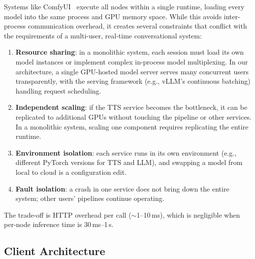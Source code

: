 \documentclass[11pt,a4paper]{article}
\begin{document}
Systems like ComfyUI~\cite{comfyui} execute all nodes within a single runtime, loading every model into the same process and GPU memory space. While this avoids inter-process communication overhead, it creates several constraints that conflict with the requirements of a multi-user, real-time conversational system:

\begin{enumerate}[nosep]
    \item \textbf{Resource sharing}: in a monolithic system, each session must load its own model instances or implement complex in-process model multiplexing. In our architecture, a single GPU-hosted model server serves many concurrent users transparently, with the serving framework (e.g., vLLM's continuous batching) handling request scheduling.
    \item \textbf{Independent scaling}: if the TTS service becomes the bottleneck, it can be replicated to additional GPUs without touching the pipeline or other services. In a monolithic system, scaling one component requires replicating the entire runtime.
    \item \textbf{Environment isolation}: each service runs in its own environment (e.g., different PyTorch versions for TTS and LLM), and swapping a model from local to cloud is a configuration edit.
    \item \textbf{Fault isolation}: a crash in one service does not bring down the entire system; other users' pipelines continue operating.
\end{enumerate}

The trade-off is HTTP overhead per call ($\sim$1--10\,ms), which is negligible when per-node inference time is 30\,ms--1\,s.

\subsection{Client Architecture}
\end{document}
